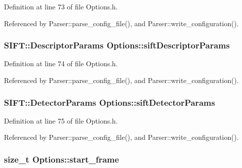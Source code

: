 \-Definition at line 73 of file \-Options.\-h.



\-Referenced by \-Parser\-::parse\-\_\-config\-\_\-file(), and \-Parser\-::write\-\_\-configuration().

\hypertarget{class_options_a59c9196b898a79ecdda3599f932aba43}{
\subsubsection[{sift\-Descriptor\-Params}]{\setlength{\rightskip}{0pt plus 5cm}\-S\-I\-F\-T\-::\-Descriptor\-Params {\bf \-Options\-::sift\-Descriptor\-Params}}}
\label{class_options_a59c9196b898a79ecdda3599f932aba43}


\-Definition at line 74 of file \-Options.\-h.



\-Referenced by \-Parser\-::parse\-\_\-config\-\_\-file(), and \-Parser\-::write\-\_\-configuration().

\hypertarget{class_options_ae1ba0a4c219005ee896951f047852f12}{
\subsubsection[{sift\-Detector\-Params}]{\setlength{\rightskip}{0pt plus 5cm}\-S\-I\-F\-T\-::\-Detector\-Params {\bf \-Options\-::sift\-Detector\-Params}}}
\label{class_options_ae1ba0a4c219005ee896951f047852f12}


\-Definition at line 75 of file \-Options.\-h.



\-Referenced by \-Parser\-::parse\-\_\-config\-\_\-file(), and \-Parser\-::write\-\_\-configuration().

\hypertarget{class_options_ab9c7cf4df6590dfc009342a9ac562c8e}{
\subsubsection[{start\-\_\-frame}]{\setlength{\rightskip}{0pt plus 5cm}size\-\_\-t {\bf \-Options\-::start\-\_\-frame}}}
\label{class_options_ab9c7cf4df6590dfc009342a9ac562c8e}


